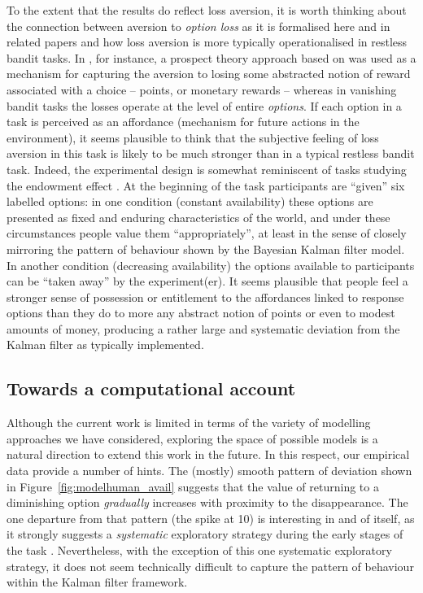 \documentclass[a4paper,doc,natbib]{apa6}
\begin{document}
To the extent that the results do reflect loss aversion, it is worth thinking about the connection between aversion to {\it option loss} as it is formalised here and in related papers \citep{shin2004keeping,ejova2009walk} and how loss aversion is more typically operationalised in restless bandit tasks. In \citet{speekenbrink2015uncertainty}, for instance, a prospect theory approach based on \citet{tversky1992advances} was used as a mechanism for capturing the aversion to losing some abstracted notion of reward associated with a choice -- points, or monetary rewards -- whereas in vanishing bandit tasks the losses operate at the level of entire {\it options}. If each option in a task is perceived as an affordance (mechanism for future actions in the environment), it seems plausible to think that the subjective feeling of loss aversion in this task is likely to be much stronger than in a typical restless bandit task. Indeed, the experimental design is somewhat reminiscent of tasks studying the endowment effect \citep{kahneman1990experimental}. At the beginning of the task participants are ``given'' six labelled options: in one condition (constant availability) these options are presented as fixed and enduring characteristics of the world, and under these circumstances people value them ``appropriately'', at least in the sense of closely mirroring the pattern of behaviour shown by the Bayesian Kalman filter model. In another condition (decreasing availability) the options available to participants can be ``taken away'' by the experiment(er). It seems plausible that people feel a stronger sense of possession or entitlement to the affordances linked to response options than they do to more any abstract notion of points or even to modest amounts of money, producing a rather large and systematic deviation from the Kalman filter as typically implemented.

\subsection{Towards a computational account}

Although the current work is limited in terms of the variety of modelling approaches we have considered, exploring the space of possible models is a natural direction to extend this work in the future. In this respect, our empirical data provide a number of hints. The (mostly) smooth pattern of deviation shown in Figure~\ref{fig:modelhuman_avail} suggests that the value of returning to a diminishing option {\it gradually} increases with proximity to the disappearance. The one departure from that pattern (the spike at 10) is interesting in and of itself, as it strongly suggests a {\it systematic} exploratory strategy during the early stages of the task \citep[see][]{acuna2010structure}. Nevertheless, with the exception of this one systematic exploratory strategy, it does not seem technically difficult to capture the pattern of behaviour within the Kalman filter framework.
\end{document}
